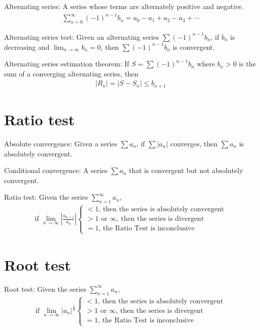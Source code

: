 \documentclass{article}
\begin{document}
Alternating series: A series whose terms are alternately positive and negative.
\begin{gather*}
    \sum_{n = 0}^\infty (-1)^{n-1} b_n = a_0 - a_1 + a_2 - a_3 + \cdots
\end{gather*}

Alternating series test: Given an alternating series $\sum (-1)^{n-1} b_n$, if $b_n$ is decreasing and $\lim_{n \to \infty} b_n = 0$, then $\sum (-1)^{n-1} b_n$ is convergent.

Alternating series estimation theorem: If $S = \sum (-1)^{n-1}b_n$ where $b_n > 0$ is the sum of a converging alternating series, then
\begin{gather*}
    |R_n| = |S - S_n| \leq b_{n + 1}
\end{gather*}

\section{Ratio test}

Absolute convergence: Given a series $\sum a_n$, if $\sum |a_n|$ converges, then $\sum a_n$ is absolutely convergent.

Conditional convergence: A series $\sum a_n$ that is convergent but not absolutely convergent.

Ratio test: Given the series $\sum_{n=1}^\infty a_n$,
\begin{gather*}
    \text{if } \lim_{n \to \infty} \left| \frac{a_{n+1}}{a_n} \right|
    \begin{cases}
        < 1 \text{, then the series is absolutely convergent} \\
        > 1 \text{ or } \infty \text{, then the series is divergent} \\
        = 1 \text{, the Ratio Test is inconclusive}
    \end{cases}
\end{gather*}

\section{Root test}

Root test: Given the series $\sum_{n=1}^\infty a_n$,
\begin{gather*}
    \text{if } \lim_{n \to \infty} |a_n|^{\frac{1}{n}}
    \begin{cases}
        < 1 \text{, then the series is absolutely convergent} \\
        > 1 \text{ or } \infty \text{, then the series is divergent} \\
        = 1 \text{, the Ratio Test is inconclusive}
    \end{cases}
\end{gather*}
\end{document}
